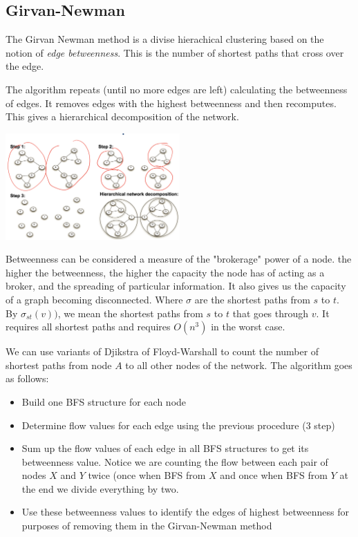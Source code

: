 \subsection{Girvan-Newman}
    The Girvan Newman method is a divise hierachical clustering based on the notion of \emph{edge betweenness}. This is the number of shortest paths that cross over the edge. 
    
    The algorithm repeats (until no more edges are left) calculating the betweenness of edges. It removes edges with the highest betweenness and then recomputes. This gives a hierarchical decomposition of the network. 
    
    \begin{center}
        \includegraphics[width=0.5\textwidth]{images/girvandecomposition.png}
    \end{center}
    
    Betweenness can be considered a measure of the "brokerage" power of a node. the higher the betweenness, the higher the capacity the node has of acting as a broker, and the spreading of particular information. It also gives us the capacity of a graph becoming disconnected. 
    Where $\sigma$ are the shortest paths from $s$ to $t$. By $\sigma_{st}(v))$, we mean the shortest paths from $s$ to $t$ that goes through $v$. It requires all shortest paths and requires $O(n^3)$ in the worst case. 
    
    We can use variants of Djikstra of Floyd-Warshall to count the number of shortest paths from node $A$ to all other nodes of the network. The algorithm goes as follows:
    
    \begin{itemize}
        \item Build one BFS structure for each node
        \item Determine flow values for each edge using the previous procedure (3 step)
        \item Sum up the flow values of each edge in all BFS structures to get its betweenness value. Notice we are counting the flow between each pair of nodes $X$ and $Y$ twice (once when BFS from $X$ and once when BFS from $Y$ at the end we divide everything by two.
        \item Use these betweenness values to identify the edges of highest betweenness for purposes of removing them in the Girvan-Newman method
    \end{itemize}
    
